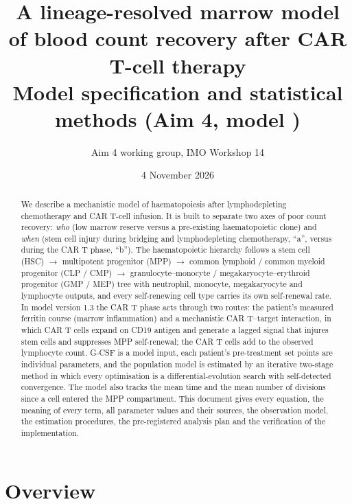 \documentclass[11pt]{article}
\title{A lineage-resolved marrow model of blood count recovery after CAR T-cell therapy\\[4pt]
\large Model specification and statistical methods (Aim 4, model \valVersion)}
\author{Aim 4 working group, IMO Workshop 14}
\date{4 November 2026}
\begin{document}
\maketitle

\begin{abstract}
\noindent We describe a mechanistic model of haematopoiesis after lymphodepleting chemotherapy and CAR T-cell infusion. It is built to separate two axes of poor count recovery: \emph{who} (low marrow reserve versus a pre-existing haematopoietic clone) and \emph{when} (stem cell injury during bridging and lymphodepleting chemotherapy, ``a'', versus during the CAR T phase, ``b''). The haematopoietic hierarchy follows a stem cell (HSC) $\rightarrow$ multipotent progenitor (MPP) $\rightarrow$ common lymphoid / common myeloid progenitor (CLP / CMP) $\rightarrow$ granulocyte--monocyte / megakaryocyte--erythroid progenitor (GMP / MEP) tree with neutrophil, monocyte, megakaryocyte and lymphocyte outputs, and every self-renewing cell type carries its own self-renewal rate. In model version 1.3 the CAR T phase acts through two routes: the patient's measured ferritin course (marrow inflammation) and a mechanistic CAR T--target interaction, in which CAR T cells expand on CD19 antigen and generate a lagged signal that injures stem cells and suppresses MPP self-renewal; the CAR T cells add to the observed lymphocyte count. G-CSF is a model input, each patient's pre-treatment set points are individual parameters, and the population model is estimated by an iterative two-stage method in which every optimisation is a differential-evolution search with self-detected convergence. The model also tracks the mean time and the mean number of divisions since a cell entered the MPP compartment. This document gives every equation, the meaning of every term, all parameter values and their sources, the observation model, the estimation procedures, the pre-registered analysis plan and the verification of the implementation.
\end{abstract}

\tableofcontents
\clearpage

\section{Overview}
\end{document}
